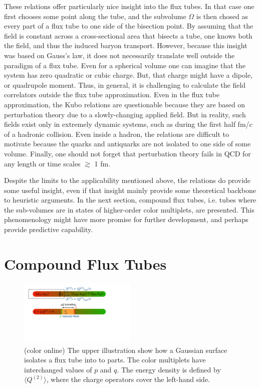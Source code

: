 \documentclass[aps, prc, 12pt, nofootinbib, showpacs, superscriptaddress, tightenlines, groupedaddress]{revtex4-2}
\begin{document}
These relations offer particularly nice insight into the flux tubes. In that case one first chooses some point along the tube, and the subvolume $\Omega$ is then chosed as every part of a flux tube to one side of the bisection point. By assuming that the field is constant across a cross-sectional area that bisects a tube, one knows both the field, and thus the induced baryon transport. However, because this insight was based on Gauss's law, it does not necessarily translate well outside the paradigm of a flux tube. Even for a spherical volume one can imagine that the system has zero quadratic or cubic charge. But, that charge might have a dipole, or quadrupole moment. Thus, in general, it is challenging to calculate the field correlators outside the flux tube approximation. Even in the flux tube approximation, the Kubo relations are questionable because they are based on perturbation theory due to a slowly-changing applied field. But in reality, such fields exist only in extremely dynamic systems, such as during the first half fm/$c$ of a hadronic collision. Even inside a hadron, the relations are difficult to motivate because the quarks and antiquarks are not isolated to one side of some volume. Finally, one should not forget that perturbation theory fails in QCD for any length or time scales $\gtrsim$ 1 fm.

Despite the limits to the applicability mentioned above, the relations do provide some useful insight, even if that insight mainly provide some theoretical backbone to heuristic arguments. In the next section, compound flux tubes, i.e. tubes where the sub-volumes are in states of higher-order color multiplets, are presented. This phenomenology might have more promise for further development, and perhaps provide predictive capability.

\section{Compound Flux Tubes}
\begin{figure}
\centerline{\includegraphics[width=0.5\textwidth]{figs/compoundtube.pdf}}
\caption{\label{fig:compoundtube}(color online)
The upper illustration show how a Gaussian surface isolates a flux tube into to parts. The color multiplets have interchanged values of $p$ and $q$. The energy density is defined by $\langle Q^{(2)}\rangle$, where the charge operators cover the left-hand side. 
}
\end{figure}
\end{document}
